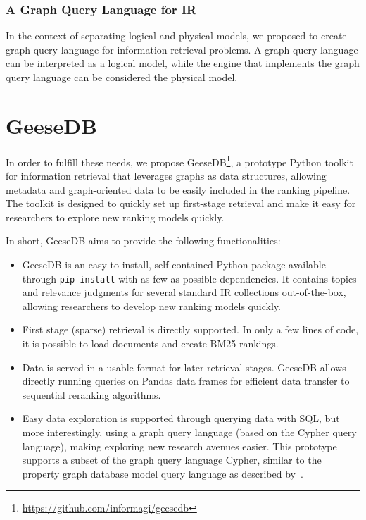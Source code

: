 \subsubsection{A Graph Query Language for IR}
In the context of separating logical and physical models, we \citep{need-graph-db} proposed to create graph query language for information retrieval problems. A graph query language can be interpreted as a logical model, while the engine that implements the graph query language can be considered the physical model. 

\section{GeeseDB}
In order to fulfill these needs, we propose GeeseDB\footnote{\url{https://github.com/informagi/geesedb}}, a prototype Python toolkit for information retrieval that leverages graphs as data structures, allowing metadata and graph-oriented data to be easily included in the ranking pipeline. The toolkit is designed to quickly set up first-stage retrieval and make it easy for researchers to explore new ranking models quickly. 

In short, GeeseDB aims to provide the following functionalities:
\begin{itemize}
	\item GeeseDB is an easy-to-install, self-contained Python package available through \texttt{pip install} with as few as possible dependencies. It contains topics and relevance judgments for several standard IR collections out-of-the-box, allowing researchers to develop new ranking models quickly. 
	\item First stage (sparse) retrieval is directly supported. In only a few lines of code, it is possible to load documents and create BM25 rankings. 
	\item Data is served in a usable format for later retrieval stages. GeeseDB allows directly running queries on Pandas data frames for efficient data transfer to sequential reranking algorithms.
	\item Easy data exploration is supported through querying data with SQL, but more interestingly, using a graph query language (based on the Cypher query language), making exploring new research avenues easier. This prototype supports a subset of the graph query language Cypher, similar to the property graph database model query language as described by~\citet{angles2018property}.
\end{itemize}

